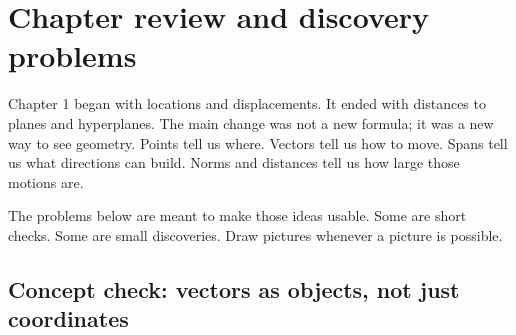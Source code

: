 \section{Chapter review and discovery problems}

Chapter 1 began with locations and displacements.  It ended with distances to planes
and hyperplanes.  The main change was not a new formula; it was a new way to see
geometry.  Points tell us where.  Vectors tell us how to move.  Spans tell us what
directions can build.  Norms and distances tell us how large those motions are.

The problems below are meant to make those ideas usable.  Some are short checks.
Some are small discoveries.  Draw pictures whenever a picture is possible.

\subsection{Concept check: vectors as objects, not just coordinates}

